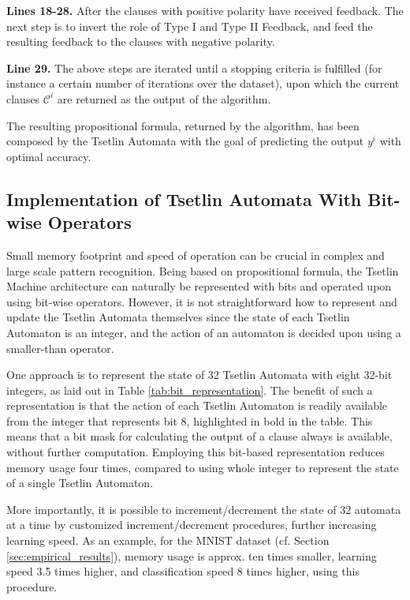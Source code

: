 \documentclass[11pt,a4paper]{article}
\begin{document}
{\bf Lines 18-28.} After the clauses with positive polarity have received feedback. The next step is to invert the role of Type I and Type II Feedback, and feed the resulting feedback to the clauses with negative polarity.

{\bf Line 29.} The above steps are iterated until a stopping criteria is fulfilled (for instance a certain number of iterations over the dataset), upon which the current clauses $\mathcal{C}^i$ are returned as the output of the algorithm.

The resulting propositional formula, returned by the algorithm,  has been composed by the Tsetlin Automata with the goal of predicting the output $y^i$ with optimal accuracy.

\subsection{Implementation of Tsetlin Automata With Bit-wise Operators}

Small memory footprint and speed of operation can be crucial in complex and large scale pattern recognition. Being based on propositional formula, the Tsetlin Machine architecture can naturally be represented with bits and operated upon using bit-wise operators. However, it is not straightforward how to represent and update the Tsetlin Automata themselves since the state of each Tsetlin Automaton is an integer, and the action of an automaton is decided upon using a smaller-than operator.

One approach is to represent the state of 32 Tsetlin Automata with eight 32-bit integers, as laid out in Table \ref{tab:bit_representation}. The benefit of such a representation is that the action of each Tsetlin Automaton is readily available from the integer that represents bit 8, highlighted in bold in the table. This means that a bit mask for calculating the output of a clause always is available, without further computation. Employing this bit-based representation reduces memory usage four times, compared to using whole integer to represent the state of a single Tsetlin Automaton.

More importantly, it is possible to increment/decrement the state of 32 automata at a time by customized increment/decrement procedures, further increasing learning speed. As an example, for the MNIST dataset (cf. Section \ref{sec:empirical_results}), memory usage is approx. ten times smaller, learning speed 3.5 times higher, and classification speed 8 times higher, using this procedure.
\end{document}

